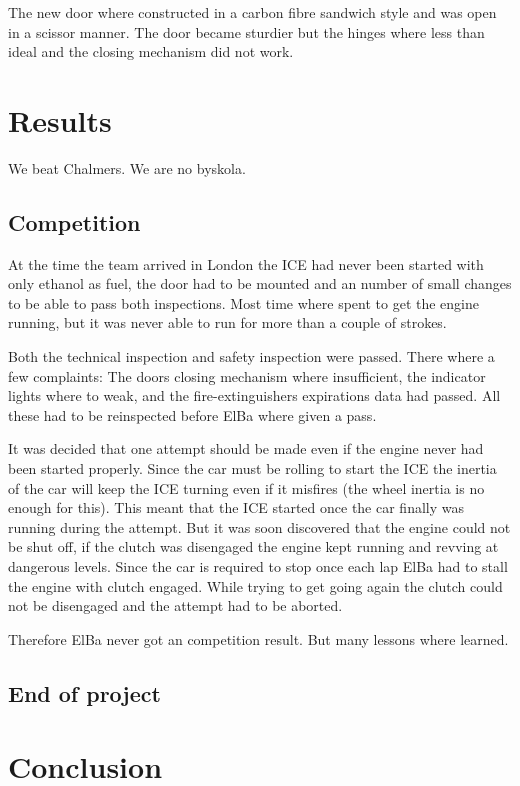 The new door where constructed in a carbon fibre sandwich style and was open in a scissor manner. The door became sturdier but the hinges where less than ideal and the closing mechanism did not work.

\section{Results}
We beat Chalmers. We are no byskola.
\subsection{Competition}
At the time the team arrived in London the ICE had never been started with only ethanol as fuel, the door had to be mounted and an number of small changes to be able to pass both inspections. Most time where spent to get the engine running, but it was never able to run for more than a couple of strokes. 

Both the technical inspection and safety inspection were passed. There where a few complaints: The doors closing mechanism where insufficient, the indicator lights where to weak, and the fire-extinguishers expirations data had passed. All these had to be reinspected before ElBa where given a pass.

It was decided that one attempt should be made even if the engine never had been started properly. Since the car must be rolling to start the ICE the inertia of the car will keep the ICE turning even if it misfires (the wheel inertia is no enough for this). This meant that the ICE started once the car finally was running during the attempt. But it was soon discovered that the engine could not be shut off, if the clutch was disengaged the engine kept running and revving at dangerous levels. Since the car is required to stop once each lap ElBa had to stall the engine with clutch engaged. While trying to get going again the clutch could not be disengaged and the attempt had to be aborted.

Therefore ElBa never got an competition result. But many lessons where learned.

\subsection{End of project}

\section{Conclusion}
